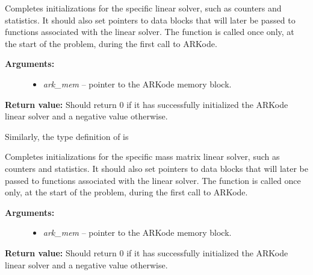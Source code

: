 \documentclass[letterpaper,10pt,english]{sphinxmanual}
\begin{document}
\begin{fulllineitems}
\label{linear_solvers/custom:linit}
Completes initializations for the specific linear solver, such as
counters and statistics.  It should also set pointers to data
blocks that will later be passed to functions associated with the
linear solver.  The {\hyperref[linear_solvers/custom:linit]{}} function is called once only,
at the start of the problem, during the first call to ARKode.
\begin{description}
\item[{\textbf{Arguments:}}] \leavevmode\begin{itemize}
\item {} 
\emph{ark\_mem} -- pointer to the ARKode memory block.

\end{itemize}

\end{description}

\textbf{Return value:}  Should return 0 if it has successfully
initialized the ARKode linear solver and a negative value
otherwise.

\end{fulllineitems}


Similarly, the type definition of {\hyperref[linear_solvers/custom:minit]{}} is

\begin{fulllineitems}
\label{linear_solvers/custom:minit}
Completes initializations for the specific mass matrix linear
solver, such as counters and statistics.  It should also set
pointers to data blocks that will later be passed to functions
associated with the linear solver.  The {\hyperref[linear_solvers/custom:minit]{}} function
is called once only, at the start of the problem, during the first
call to ARKode.
\begin{description}
\item[{\textbf{Arguments:}}] \leavevmode\begin{itemize}
\item {} 
\emph{ark\_mem} -- pointer to the ARKode memory block.

\end{itemize}

\end{description}

\textbf{Return value:}  Should return 0 if it has successfully
initialized the ARKode linear solver and a negative value
otherwise.

\end{fulllineitems}
\end{document}

